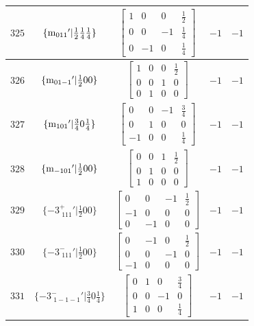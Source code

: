 \documentclass[fleqn,8pt]{jsarticle}
\begin{document}
\begin{longtable}{ccccc}
$ 325 $ & $ \{{\rm m}_{011}{}'|\frac{1}{2} \frac{1}{4} \frac{1}{4}\} $ & $ \begin{bmatrix} 1 & 0 & 0 & \frac{1}{2} \\ 0 & 0 & -1 & \frac{1}{4} \\ 0 & -1 & 0 & \frac{1}{4} \end{bmatrix} $ & $ -1 $ & $ -1 $ \\ \hline
$ 326 $ & $ \{{\rm m}_{01-1}{}'|\frac{1}{2} 0 0\} $ & $ \begin{bmatrix} 1 & 0 & 0 & \frac{1}{2} \\ 0 & 0 & 1 & 0 \\ 0 & 1 & 0 & 0 \end{bmatrix} $ & $ -1 $ & $ -1 $ \\ \hline
$ 327 $ & $ \{{\rm m}_{101}{}'|\frac{3}{4} 0 \frac{1}{4}\} $ & $ \begin{bmatrix} 0 & 0 & -1 & \frac{3}{4} \\ 0 & 1 & 0 & 0 \\ -1 & 0 & 0 & \frac{1}{4} \end{bmatrix} $ & $ -1 $ & $ -1 $ \\ \hline
$ 328 $ & $ \{{\rm m}_{-101}{}'|\frac{1}{2} 0 0\} $ & $ \begin{bmatrix} 0 & 0 & 1 & \frac{1}{2} \\ 0 & 1 & 0 & 0 \\ 1 & 0 & 0 & 0 \end{bmatrix} $ & $ -1 $ & $ -1 $ \\ \hline
$ 329 $ & $ \{-3^{+}_{\,\,111}{}'|\frac{1}{2} 0 0\} $ & $ \begin{bmatrix} 0 & 0 & -1 & \frac{1}{2} \\ -1 & 0 & 0 & 0 \\ 0 & -1 & 0 & 0 \end{bmatrix} $ & $ -1 $ & $ -1 $ \\ \hline
$ 330 $ & $ \{-3^{-}_{\,\,111}{}'|\frac{1}{2} 0 0\} $ & $ \begin{bmatrix} 0 & -1 & 0 & \frac{1}{2} \\ 0 & 0 & -1 & 0 \\ -1 & 0 & 0 & 0 \end{bmatrix} $ & $ -1 $ & $ -1 $ \\ \hline
$ 331 $ & $ \{-3^{-}_{\,\,1-1-1}{}'|\frac{3}{4} 0 \frac{1}{4}\} $ & $ \begin{bmatrix} 0 & 1 & 0 & \frac{3}{4} \\ 0 & 0 & -1 & 0 \\ 1 & 0 & 0 & \frac{1}{4} \end{bmatrix} $ & $ -1 $ & $ -1 $ \\ \hline

\end{longtable}
\end{document}
